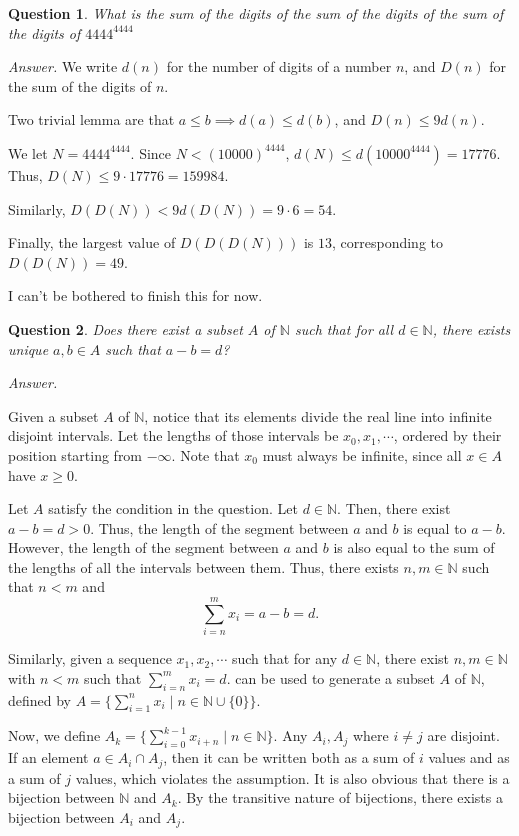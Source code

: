 \documentclass{article}
\newtheorem{question}{Question}
\newenvironment{answer}{\par\noindent\textit{Answer.}}{\par}
\begin{document}
\begin{question}
What is the sum of the digits of the sum of the digits of the sum of the digits of $4444^{4444}$
\end{question}

\begin{answer}
    We write $d(n)$ for the number of digits of a number $n$,
    and $D(n)$ for the sum of the digits of $n$.

    Two trivial lemma are that $a \le b \implies d(a) \le d(b)$,
    and $D(n) \le 9d(n)$.

    We let $N = 4444^{4444}$. Since $N < (10000)^{4444}$, $d(N) \le d(10000^{4444}) = 17776$.
    Thus, $D(N) \le 9 \cdot 17776 = 159984$.

    Similarly, $D(D(N)) < 9d(D(N)) = 9 \cdot 6 = 54$.

    Finally, the largest value of $D(D(D(N)))$ is $13$, corresponding to $D(D(N)) = 49$.

    I can't be bothered to finish this for now.
\end{answer}

\begin{question}
Does there exist a subset $A$ of $\mathbb{N}$ such that
for all $d \in \mathbb{N}$, there exists unique $a,b \in A$ such that $a - b = d$?
\end{question}

\begin{answer}
\end{answer}

Given a subset $A$ of $\mathbb{N}$, notice that its elements divide
the real line into infinite disjoint intervals.
Let the lengths of those intervals be $x_{0},x_{1},\cdots$, ordered by
their position starting from $-\infty$. 
Note that $x_{0}$ must always be infinite, since all $x \in A$ have $x \ge 0$.

Let $A$ satisfy the condition in the question.
Let $d \in \mathbb{N}$. Then, there exist $a - b = d > 0$.
Thus, the length of the segment between $a$ and $b$ is equal to $a - b$.
However, the length of the segment between $a$ and $b$ is also
equal to the sum of the lengths of all the intervals between them.
Thus, there exists $n,m \in \mathbb{N}$ such that $n<m$ and
\[\sum_{i=n}^{m}x_i = a - b = d.\]

Similarly, given a sequence $x_1,x_2,\cdots$ such that
for any $d \in \mathbb{N}$, there exist $n,m \in \mathbb{N}$ with $n < m$ such that
$\sum_{i=n}^{m}x_i  = d.$
can be used to generate a subset $A$ of $\mathbb{N}$, defined by
$A = \{\sum_{i=1}^{n}x_i \mid n \in \mathbb{N} \cup \{0\}\}$.

Now, we define $A_k = \{\sum_{i=0}^{k-1}x_{i+n} \mid n \in \mathbb{N}\}$.
Any $A_i,A_j$ where $i \ne j$ are disjoint.
If an element $a \in A_i \cap A_j$, then it can be written both
as a sum of $i$ values and as a sum of $j$ values, which violates the assumption.
It is also obvious that there is a bijection between $\mathbb{N}$ and $A_{k}$.
By the transitive nature of bijections, there exists a bijection between $A_{i}$ and $A_{j}$.
\end{document}
